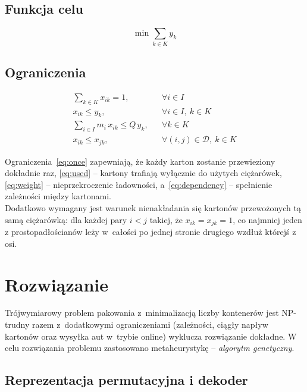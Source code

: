 \documentclass[12pt]{article}
\begin{document}
\subsection{Funkcja celu}
\[
\min \sum_{k\in K} y_k
\]

\subsection{Ograniczenia}
\begin{align}
    \sum_{k\in K} x_{ik} = 1, & &\forall i\in I \label{eq:once}\\
    x_{ik} \le y_k, & &\forall i\in I,\ k\in K \label{eq:used}\\
    \sum_{i\in I} m_i\,x_{ik} \le Q\,y_k, & &\forall k\in K \label{eq:weight}\\
    x_{ik} \le x_{jk}, & &\forall (i,j)\in\mathcal{D},\ k\in K \label{eq:dependency}
\end{align}


Ograniczenia~\eqref{eq:once} zapewniają, że każdy karton zostanie przewieziony dokładnie raz, \eqref{eq:used} -- kartony trafiają wyłącznie do użytych ciężarówek, \eqref{eq:weight} -- nieprzekroczenie ładowności, a~\eqref{eq:dependency} -- spełnienie zależności między kartonami. \\
Dodatkowo wymagany jest warunek nienakładania się kartonów przewożonych tą samą ciężarówką: dla każdej pary $i<j$ takiej, że $x_{ik}=x_{jk}=1$, co najmniej jeden z prostopadłościanów leży w~całości po jednej stronie drugiego wzdłuż którejś z osi.

\section{Rozwiązanie}

Trójwymiarowy problem pakowania z~minimalizacją liczby kontenerów jest NP-trudny razem z~dodatkowymi ograniczeniami (zależności, ciągły napływ kartonów oraz wysyłka aut w~trybie online) wyklucza rozwiązanie dokładne. W celu rozwiązania problemu zastosowano metaheurystykę -- \textit{algorytm genetyczny}.

\subsection{Reprezentacja permutacyjna i dekoder}
\end{document}
